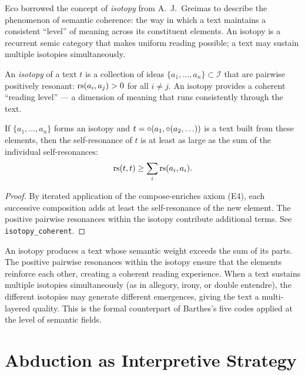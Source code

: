 Eco borrowed the concept of \emph{isotopy} from A.~J.\ Greimas to
describe the phenomenon of semantic coherence: the way in which a text
maintains a consistent ``level'' of meaning across its constituent
elements. An isotopy is a recurrent semic category that makes uniform
reading possible; a text may sustain multiple isotopies simultaneously.

\begin{definition}[Isotopy]
\label{def:isotopy}
An \emph{isotopy} of a text $t$ is a collection of ideas
$\{a_1, \ldots, a_n\} \subset \mathcal{I}$ that are pairwise
positively resonant: $\mathrm{rs}(a_i, a_j) > 0$ for all $i \neq j$.
An isotopy provides a coherent ``reading level'' --- a dimension of
meaning that runs consistently through the text.
\end{definition}

\begin{theorem}
\label{thm:isotopy-coherent}
If $\{a_1, \ldots, a_n\}$ forms an isotopy and $t = \circ(a_1,
\circ(a_2, \ldots))$ is a text built from these elements, then
the self-resonance of $t$ is at least as large as the sum of the
individual self-resonances:
\[
  \mathrm{rs}(t, t) \geq \sum_i \mathrm{rs}(a_i, a_i).
\]
\end{theorem}

\begin{proof}
By iterated application of the compose-enriches axiom (E4), each
successive composition adds at least the self-resonance of the new
element. The positive pairwise resonances within the isotopy
contribute additional terms. See \texttt{isotopy\_coherent}.
\end{proof}

\begin{interpretation}
An isotopy produces a text whose semantic weight exceeds the sum of
its parts. The positive pairwise resonances within the isotopy ensure
that the elements reinforce each other, creating a coherent reading
experience. When a text sustains multiple isotopies simultaneously
(as in allegory, irony, or double entendre), the different isotopies
may generate different emergences, giving the text a multi-layered
quality. This is the formal counterpart of Barthes's five codes
applied at the level of semantic fields.
\end{interpretation}

\section{Abduction as Interpretive Strategy}

